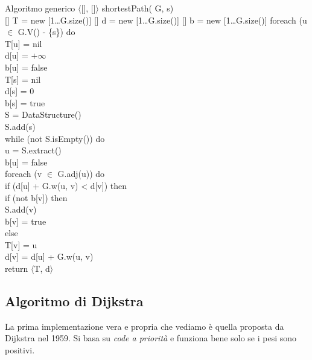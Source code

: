 \begin{minicode}{Algoritmo generico}
\ind$\langle$[], []$\rangle$ shortestPath( G,  s)\\
    [] T = new [1\dots G.size()]\hfill{}
    [] d = new [1\dots G.size()]\hfill{}
    [] b = new [1\dots G.size()]\hfill{}
    \indf foreach (u $\in$ G.V() - \{s\}) do\\
        T[u] = nil\\
        d[u] = $+\infty$\\
        b[u] = false\\
    \indf T[s] = nil\\
    \indf d[s] = 0\\
    \indf b[s] = true\\
    \indf{} S = DataStructure()\\
    \indf S.add(s)\\
    \indf while (not S.isEmpty()) do\\
         u = S.extract()\\
        b[u] = false\\
        \indff foreach (v $\in$ G.adj(u)) do\\
            \indfff if (d[u] + G.w(u, v) < d[v]) then\\
                \indffff if (not b[v]) then\\
                    S.add(v)\\
                    b[v] = true\\
                \indffff else\\
                \indffff T[v] = u\\
                \indffff d[v] = d[u] + G.w(u, v)\\
    \indf return $\langle$T, d$\rangle$
\end{minicode}

\subsection{Algoritmo di Dijkstra}
La prima implementazione vera e propria che vediamo è quella proposta da
Dijkstra nel 1959. Si basa su \emph{code a priorità} e funziona bene solo se
i pesi sono positivi.

